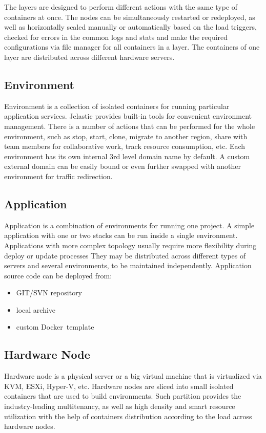 \documentclass[9pt,twocolumn,twoside]{styles/osajnl}
\begin{document}
The layers are designed to perform different actions with the same type of
containers at once. The nodes can be simultaneously restarted or redeployed, as
well as horizontally scaled manually or automatically based on the load triggers,
checked for errors in the common logs and stats and make the required
configurations via file manager for all containers in a layer. The containers of
one layer are distributed across different hardware servers.\cite{www-jelastic5}

\subsection{Environment}
Environment is a collection of isolated containers for running particular
application services. Jelastic provides built-in tools for convenient
environment management. There is a number of actions that can be performed for
the whole environment, such as stop, start, clone, migrate to another region,
share with team members for collaborative work, track resource consumption, etc.
Each environment has its own internal 3rd level domain name by default. A custom
external domain can be easily bound or even further swapped with another
environment for traffic redirection.\cite{www-jelastic2}

\subsection{Application}
Application is a combination of environments for running one project. A simple
application with one or two stacks can be run inside a single environment.
Applications with more complex topology usually require more flexibility during
deploy or update processes They may be distributed across different types of
servers and several environments, to be maintained independently. Application
source code can be deployed from:\cite{paper-jelastic2}
\begin{itemize}
\renewcommand{\labelitemi}{\scriptsize$\square$}
\item GIT/SVN repository
\item local archive
\item custom Docker template
\end{itemize}\cite{www-jelastic1}

\subsection{Hardware Node}
Hardware node is a physical server or a big virtual machine that is virtualized
via KVM, ESXi, Hyper-V, etc. Hardware nodes are sliced into small isolated
containers that are used to build environments. Such partition provides the
industry-leading multitenancy, as well as high density and smart resource
utilization with the help of containers distribution according to the load
across hardware nodes.\cite{www-jelastic3}\cite{paper-jelastic1}
\end{document}
